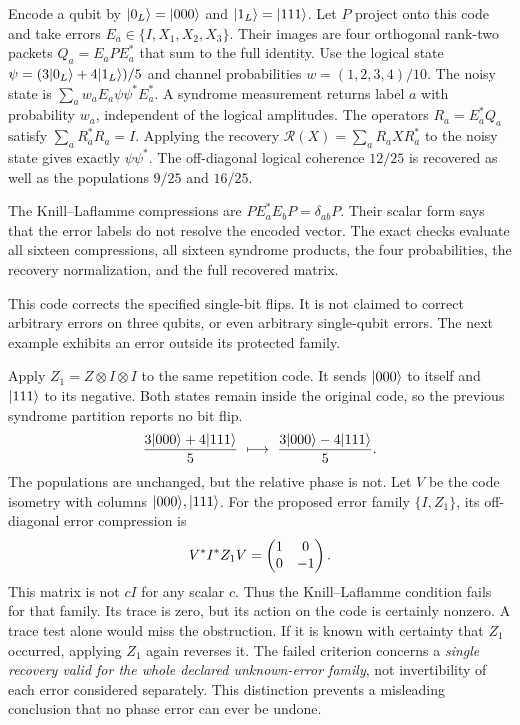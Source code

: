 Encode a qubit by $\lvert 0_L\rangle=\lvert 000\rangle$ and $\lvert 1_L\rangle=\lvert 111\rangle$. Let $P$ project onto this code and take errors $E_a\in\{I,X_1,X_2,X_3\}$. Their images are four orthogonal rank-two packets $Q_a=E_aPE_a^*$ that sum to the full identity.
Use the logical state $\psi=(3\lvert 0_L\rangle+4\lvert 1_L\rangle)/5$ and channel probabilities $w=(1,2,3,4)/10$. The noisy state is $\sum_aw_aE_a\psi\psi^*E_a^*$. A syndrome measurement returns label $a$ with probability $w_a$, independent of the logical amplitudes.
The operators $R_a=E_a^*Q_a$ satisfy $\sum_aR_a^*R_a=I$. Applying the recovery $\mathcal R(X)=\sum_aR_aXR_a^*$ to the noisy state gives exactly $\psi\psi^*$. The off-diagonal logical coherence $12/25$ is recovered as well as the populations $9/25$ and $16/25$.

The Knill--Laflamme compressions are $PE_a^*E_bP=\delta_{ab}P$. Their scalar form says that the error labels do not resolve the encoded vector. The exact checks evaluate all sixteen compressions, all sixteen syndrome products, the four probabilities, the recovery normalization, and the full recovered matrix.

This code corrects the specified single-bit flips. It is not claimed to correct arbitrary errors on three qubits, or even arbitrary single-qubit errors. The next example exhibits an error outside its protected family.

Apply $Z_1=Z\otimes I\otimes I$ to the same repetition code. It sends $\lvert 000\rangle$ to itself and $\lvert 111\rangle$ to its negative. Both states remain inside the original code, so the previous syndrome partition reports no bit flip.
\[
\frac{3\lvert 000\rangle+4\lvert 111\rangle}5
\ \longmapsto\
\frac{3\lvert 000\rangle-4\lvert 111\rangle}5.
\]
The populations are unchanged, but the relative phase is not.
Let $V$ be the code isometry with columns $\lvert 000\rangle,\lvert 111\rangle$. For the proposed error family $\{I,Z_1\}$, its off-diagonal error compression is
\[
V^*I^*Z_1V=\begin{pmatrix}1&0\\0&-1\end{pmatrix}.
\]
This matrix is not $cI$ for any scalar $c$. Thus the Knill--Laflamme condition fails for that family. Its trace is zero, but its action on the code is certainly nonzero. A trace test alone would miss the obstruction.
\head{Known correction versus family recovery}
If it is known with certainty that $Z_1$ occurred, applying $Z_1$ again reverses it. The failed criterion concerns a \emph{single recovery valid for the whole declared unknown-error family}, not invertibility of each error considered separately. This distinction prevents a misleading conclusion that no phase error can ever be undone.

